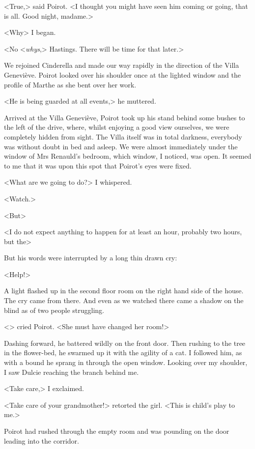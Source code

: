  <True,> said Poirot. <I thought you might have seen him coming or going, that is all. Good night, madame.> 

 <Why\longdash> I began. 

 <No <\emph{whys},> Hastings. There will be time for that later.> 

 We rejoined Cinderella and made our way rapidly in the direction of the Villa Geneviève. Poirot looked over his shoulder once at the lighted window and the profile of Marthe as she bent over her work. 

 <He is being guarded at all events,> he muttered. 

 Arrived at the Villa Geneviève, Poirot took up his stand behind some bushes to the left of the drive, where, whilst enjoying a good view ourselves, we were completely hidden from sight. The Villa itself was in total darkness, everybody was without doubt in bed and asleep. We were almost immediately under the window of Mrs Renauld's bedroom, which window, I noticed, was open. It seemed to me that it was upon this spot that Poirot's eyes were fixed. 

 <What are we going to do?> I whispered. 

 <Watch.> 

 <But\longdash> 

 <I do not expect anything to happen for at least an hour, probably two hours, but the\longdash> 

 But his words were interrupted by a long thin drawn cry: 

 <Help!> 

 A light flashed up in the second floor room on the right hand side of the house. The cry came from there. And even as we watched there came a shadow on the blind as of two people struggling. 

 <> cried Poirot. <She must have changed her room!> 

 Dashing forward, he battered wildly on the front door. Then rushing to the tree in the flower-bed, he swarmed up it with the agility of a cat. I followed him, as with a bound he sprang in through the open window. Looking over my shoulder, I saw Dulcie reaching the branch behind me. 

 <Take care,> I exclaimed. 

 <Take care of your grandmother!> retorted the girl. <This is child's play to me.> 

 Poirot had rushed through the empty room and was pounding on the door leading into the corridor. 

